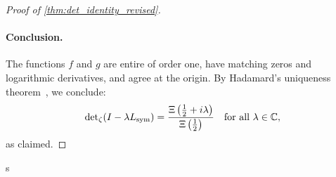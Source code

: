 \begin{proof}[Proof of \cref{thm:det_identity_revised}]
\paragraph{Conclusion.}
The functions \( f \) and \( g \) are entire of order one, have matching zeros and logarithmic derivatives, and agree at the origin. By Hadamard’s uniqueness theorem~\cite[Ch.~3]{Levin1996EntireLectures}, we conclude:
\[
\det\nolimits_\zeta(I - \lambda L_{\mathrm{sym}}) = \frac{\Xi\left( \tfrac{1}{2} + i\lambda \right)}{\Xi\left( \tfrac{1}{2} \right)}
\quad \text{for all } \lambda \in \mathbb{C},
\]
as claimed.
\end{proof}
s